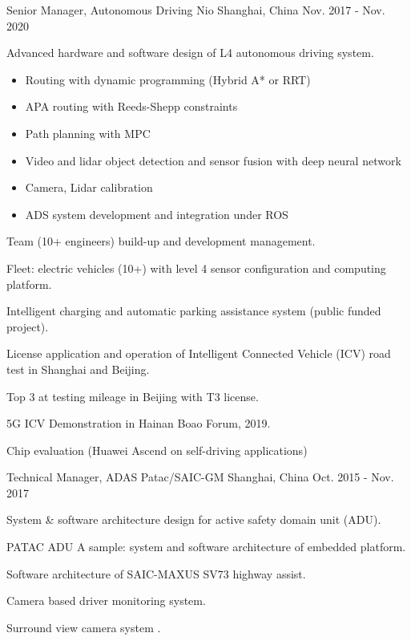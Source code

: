 \documentclass[../cv.tex]{subfiles}
\begin{document}
\begin{cventries}
	\cventry
	{Senior Manager, Autonomous Driving} %
	{Nio} %
	{Shanghai, China} %
	{Nov. 2017 - Nov. 2020} %
	{
		\begin{cvitems}
			\item Advanced hardware and software design of L4 autonomous driving system.
			\begin{itemize}
				\item Routing with dynamic programming (Hybrid A* or RRT)
				\item APA routing with Reeds-Shepp constraints
				\item Path planning with MPC
				\item Video and lidar object detection and sensor fusion with deep neural network
				\item Camera, Lidar calibration
				\item ADS system development and integration under ROS
			\end{itemize}
			\item Team (10+ engineers) build-up and development management.
			\item Fleet: electric vehicles (10+) with level 4 sensor configuration and computing platform.
			\item Intelligent charging and automatic parking assistance system (public funded project).
			\item License application and operation of Intelligent Connected Vehicle (ICV) road test in Shanghai and Beijing.
			\item Top 3 at testing mileage in Beijing with T3 license.
			\item 5G ICV Demonstration in Hainan Boao Forum, 2019.
			\item Chip evaluation (Huawei Ascend on self-driving applications)
		\end{cvitems}
	}

	\cventry
	{Technical Manager, ADAS} %
	{Patac/SAIC-GM} %
	{Shanghai, China} %
	{Oct. 2015 - Nov. 2017} %
	{
		\begin{cvitems}
			\item System \& software architecture design for active safety domain unit (ADU).
			\item PATAC ADU A sample: system and software architecture of embedded platform.
			\item Software architecture of SAIC-MAXUS SV73 highway assist.
			\item Camera based driver monitoring system.
			\item Surround view camera system \supercite{Xin_RearView_17}.
		\end{cvitems}
	}



\end{cventries}
\end{document}
